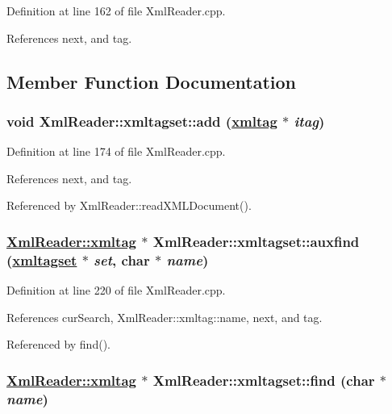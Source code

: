 Definition at line 162 of file Xml\-Reader.cpp.

References next, and tag.

\subsection{Member Function Documentation}
\hypertarget{classXmlReader_1_1xmltagset_a2}{
\subsubsection[add]{\setlength{\rightskip}{0pt plus 5cm}void Xml\-Reader::xmltagset::add (\hyperlink{classXmlReader_1_1xmltag}{xmltag} $\ast$ {\em itag})}}
\label{classXmlReader_1_1xmltagset_a2}




Definition at line 174 of file Xml\-Reader.cpp.

References next, and tag.

Referenced by Xml\-Reader::read\-XMLDocument().\hypertarget{classXmlReader_1_1xmltagset_b0}{
\subsubsection[auxfind]{\setlength{\rightskip}{0pt plus 5cm}\hyperlink{classXmlReader_1_1xmltag}{Xml\-Reader::xmltag} $\ast$ Xml\-Reader::xmltagset::auxfind (\hyperlink{classXmlReader_1_1xmltagset}{xmltagset} $\ast$ {\em set}, char $\ast$ {\em name})}}
\label{classXmlReader_1_1xmltagset_b0}




Definition at line 220 of file Xml\-Reader.cpp.

References cur\-Search, Xml\-Reader::xmltag::name, next, and tag.

Referenced by find().\hypertarget{classXmlReader_1_1xmltagset_a3}{
\subsubsection[find]{\setlength{\rightskip}{0pt plus 5cm}\hyperlink{classXmlReader_1_1xmltag}{Xml\-Reader::xmltag} $\ast$ Xml\-Reader::xmltagset::find (char $\ast$ {\em name})}}
\label{classXmlReader_1_1xmltagset_a3}




